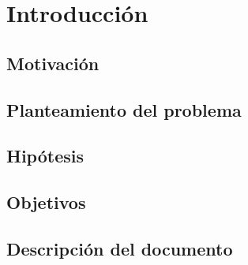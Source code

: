 \chapter{Introducción}

\section{Motivación}
\section{Planteamiento del problema}
\section{Hipótesis}
\section{Objetivos}
\section{Descripción del documento}